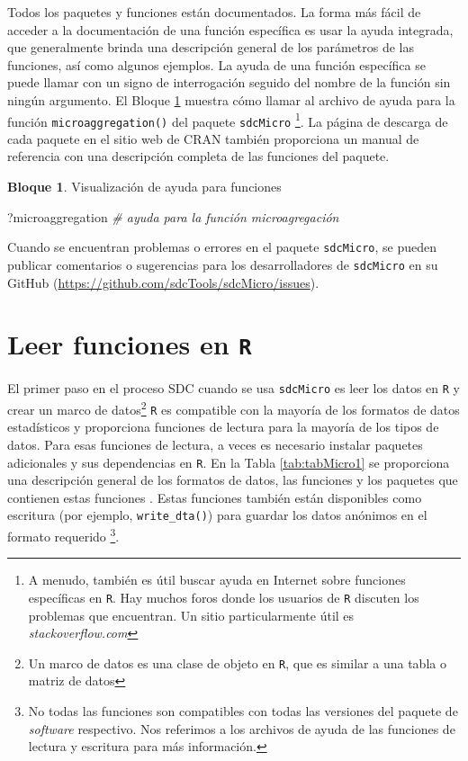 \documentclass[
]{book}
\newenvironment{Shaded}{\begin{snugshade}}{\end{snugshade}}
\newcommand{\CommentTok}[1]{\textcolor[rgb]{0.56,0.35,0.01}{\textit{#1}}}
\newcommand{\NormalTok}[1]{#1}
\theoremstyle{definition}
\theoremstyle{definition}
\newtheorem{example}{Bloque}[chapter]
\theoremstyle{definition}
\theoremstyle{definition}
\theoremstyle{remark}
\begin{document}
Todos los paquetes y funciones están documentados. La forma más fácil de acceder a la documentación de una función específica es usar la ayuda integrada, que generalmente brinda una descripción general de los parámetros de las funciones, así como algunos ejemplos. La ayuda de una función específica se puede llamar con un signo de interrogación seguido del nombre de la función sin ningún argumento. El Bloque \ref{exm:bloqueMicro2} muestra cómo llamar al archivo de ayuda para la función \texttt{microaggregation()} del paquete \texttt{sdcMicro} \footnote{A menudo, también es útil buscar ayuda en Internet sobre funciones específicas en \texttt{R}. Hay muchos foros donde los usuarios de \texttt{R} discuten los problemas que encuentran. Un sitio particularmente útil es \emph{stackoverflow.com}}. La página de descarga de cada paquete en el sitio web de CRAN también proporciona un manual de referencia con una descripción completa de las funciones del paquete.

\begin{example}
\protect\hypertarget{exm:bloqueMicro2}{}\label{exm:bloqueMicro2}Visualización de ayuda para funciones
\end{example}

\begin{Shaded}
\begin{Highlighting}[]
\NormalTok{?microaggregation }\CommentTok{\# ayuda para la función microagregación}
\end{Highlighting}
\end{Shaded}

Cuando se encuentran problemas o errores en el paquete \texttt{sdcMicro}, se pueden publicar comentarios o sugerencias para los desarrolladores de \texttt{sdcMicro} en su GitHub (\url{https://github.com/sdcTools/sdcMicro/issues}).

\hypertarget{leer-funciones-en-r}{%
\section{\texorpdfstring{Leer funciones en \texttt{R}}{Leer funciones en R}}\label{leer-funciones-en-r}}

El primer paso en el proceso SDC cuando se usa \texttt{sdcMicro} es leer los datos en \texttt{R} y crear un marco de datos\footnote{Un marco de datos es una clase de objeto en \texttt{R}, que es similar a una tabla o matriz de datos} \texttt{R} es compatible con la mayoría de los formatos de datos estadísticos y proporciona funciones de lectura para la mayoría de los tipos de datos. Para esas funciones de lectura, a veces es necesario instalar paquetes adicionales y sus dependencias en \texttt{R}. En la Tabla \ref{tab:tabMicro1} se proporciona una descripción general de los formatos de datos, las funciones y los paquetes que contienen estas funciones . Estas funciones también están disponibles como escritura (por ejemplo, \texttt{write\_dta()}) para guardar los datos anónimos en el formato requerido \footnote{No todas las funciones son compatibles con todas las versiones del paquete de \emph{software} respectivo. Nos referimos a los archivos de ayuda de las funciones de lectura y escritura para más información.}.
\end{document}
